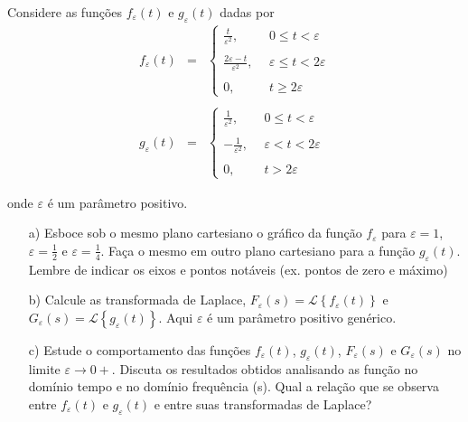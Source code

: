 \begin{Exercise}{\label{ex_delta_dirac0}} Considere as funções $f_\varepsilon (t)$  e $g_\varepsilon (t)$ dadas por
\begin{eqnarray*}
 f_\varepsilon(t)&=&\left\{\begin{array}{ll}
			    \frac{t}{\varepsilon^2}, ~~ &0\leq t < \varepsilon\\~\\
			    \frac{2\varepsilon-t}{\varepsilon^2}, ~~ &\varepsilon\leq t < 2\varepsilon\\~\\
			    0,&t\geq 2\varepsilon
			    \end{array}
\right.\\~\\
g_\varepsilon(t)&=&\left\{\begin{array}{ll}
			    \frac{1}{\varepsilon^2}, ~~ &0\leq t < \varepsilon\\~\\
			    -\frac{1}{\varepsilon^2}, ~~ &\varepsilon< t < 2\varepsilon\\~\\
			    0,&t>2\varepsilon
			    \end{array}
\right.
\end{eqnarray*}


onde $\varepsilon$ é um parâmetro positivo.

\begin{itemize}
  \item [a)] Esboce sob o mesmo plano cartesiano o gráfico da função $f_\varepsilon$ para $\varepsilon=1$, $\varepsilon=\frac{1}{2}$ e $\varepsilon=\frac{1}{4}$. Faça o mesmo em outro plano cartesiano para a função $g_\varepsilon(t)$. Lembre de indicar os eixos e pontos notáveis (ex. pontos de zero e máximo)
  \item [b)] Calcule as transformada de Laplace, $F_\varepsilon(s)=\mathcal{L}\left\{f_\varepsilon(t)\right\}$ e $G_\varepsilon(s)=\mathcal{L}\left\{g_\varepsilon(t)\right\}$. Aqui $\varepsilon$ é um parâmetro positivo genérico.
\item [c)] Estude o comportamento das funções $f_\varepsilon(t)$, $g_\varepsilon(t)$, $F_\varepsilon(s)$ e $G_\varepsilon(s)$ no limite $\varepsilon\to 0+$. Discuta os resultados obtidos analisando as função no domínio tempo e no domínio frequência (s). Qual a relação que se observa entre $f_\varepsilon(t)$ e $g_\varepsilon(t)$ e entre suas transformadas de Laplace?
\end{itemize}
\end{Exercise}


